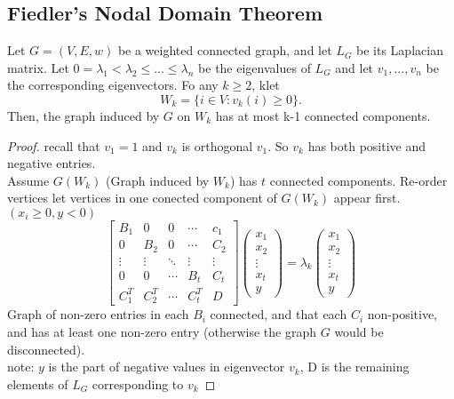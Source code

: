 \subsection{Fiedler’s Nodal Domain Theorem}
\begin{theorem}
    Let $G=(V,E,w)$ be a weighted connected graph, and let $L_G$ be its Laplacian matrix. Let $0=\lambda_1 <\lambda_2 \le ...\le \lambda_n$ be the eigenvalues of $L_G$ and let $v_1,...,v_n$ be the corresponding eigenvectors. Fo any $k\ge 2$, klet
    \[
        W_k=\{i\in V: v_k(i)\ge 0 \}.
    \]
    Then, the graph induced by $G$ on $W_k$ has at most k-1 connected components.
\end{theorem}
\begin{proof}
recall that $v_1=1$ and $v_k$ is orthogonal $v_1$. So $v_k $ has both positive and negative entries.\\
Assume $G(W_k)$ (Graph induced by $W_k$) has $t$ connected components. Re-order vertices let vertices in one conected component of $G(W_k)$ appear first.$(x_i\ge 0,y<0)$
\[
   \displaystyle \left[\begin{array}{ccccc}B_1 & 0 & 0& \cdots &c_1 \\0 & B_2 & 0& \cdots  &C_2 \\ \vdots & \vdots &\ddots  & \vdots & \vdots\\
   0& 0& \cdots  &B_t &C_t\\C_1^T &C_2^T&\cdots  &C_t^T&D \end{array}\right] \left(\begin{array}{c}x_1  \\x_2\\ \vdots \\x_t\\y \end{array}\right)= \lambda_k \left(\begin{array}{c}x_1  \\x_2\\ \vdots \\x_t\\y \end{array}\right)
\]
Graph of non-zero entries in each $B_i$ connected, and that each $C_i$ non-positive, and has at least one non-zero entry (otherwise the graph $G$ would be disconnected).\\
note: $y$ is the part of negative values in eigenvector $v_k$, D is the remaining elements of $L_G$ corresponding to $v_k$


\end{proof}
